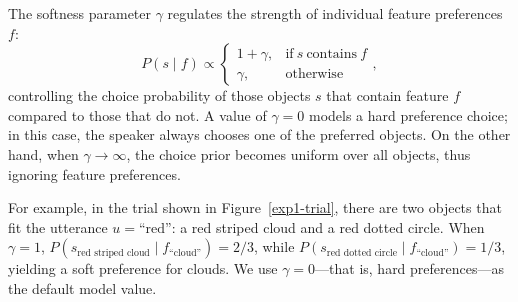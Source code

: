 \documentclass[11pt,a4paper]{article}
\begin{document}
The softness parameter $\gamma$ regulates the strength of individual feature preferences $f$:
\begin{equation}
	P(s \mid f) \propto \begin{cases}
		1 + \gamma, & \text{if}\ s\ \text{contains}\ f \\
		\gamma, & \text{otherwise}
	\end{cases},
\end{equation}
controlling the choice probability of those objects $s$ that contain feature $f$ compared to those that do not.  
A value of $\gamma=0$ models a hard preference choice; in this case, the speaker always chooses one of the preferred objects. 
On the other hand, when $\gamma \rightarrow \infty$, the choice prior becomes uniform over all objects, thus ignoring feature preferences. 

For example, in the trial shown in Figure~\ref{exp1-trial}, there are two objects that fit the utterance $u=\text{``red''}$: a red striped cloud and a red dotted circle.
When $\gamma=1$, $P(s_{\textrm{red\ striped\ cloud}}\mid f_{\textrm{``cloud''}}) = 2/3$, while
$P(s_{\textrm{red\ dotted\ circle}}\mid f_{\textrm{``cloud''}})= 1/3$, yielding a soft preference for clouds.
We use $\gamma=0$---that is, hard preferences---as the default model value.
\end{document}
